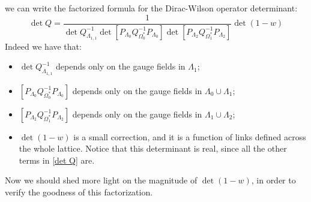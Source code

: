 we can write the factorized formula for the Dirac-Wilson operator determinant:
\begin{equation}\label{det Q}
    \det Q = \frac{1}{\det Q_{\Lambda_{1,1}}^{-1} \det \left[ P_{\Lambda_0} Q^{-1}_{\Omega^*_0} P_{\Lambda_0} \right] \det \left[ P_{\Lambda_2} Q^{-1}_{\Omega^*_1} P_{\Lambda_2}  \right] } \det (1 - w)
\end{equation}
Indeed we have that:
\begin{itemize}
    \item $\det Q_{\Lambda_{1,1}}^{-1}$ depends only on the gauge fields in $\Lambda_1$;
    \item $\left[ P_{\Lambda_0} Q^{-1}_{\Omega^*_0} P_{\Lambda_0} \right]$ depends only on the gauge fields in $\Lambda_0 \cup \Lambda_1$;
    \item $\left[ P_{\Lambda_2} Q^{-1}_{\Omega^*_1} P_{\Lambda_2}  \right]$ depends only on the gauge fields in $\Lambda_1 \cup \Lambda_2$;
    \item $\det (1 - w)$ is a small correction, and it is a function of links defined across the whole lattice. Notice that this determinant is real, since all the other terms in \eqref{det Q} are.
\end{itemize}
Now we should shed more light on the magnitude of $\det(1 - w)$, in order to verify the goodness of this factorization.

